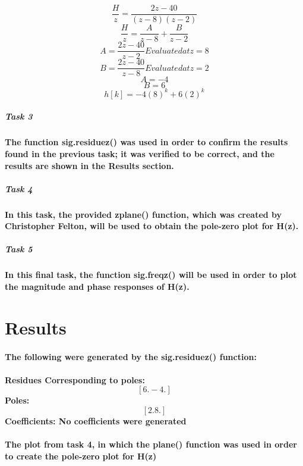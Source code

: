 \documentclass[12pt,a4paper]{article}
\begin{document}
$$\frac{H}{z} = \frac{2z-40}{(z - 8)(z - 2)}$$
$$\frac{H}{z} = \frac{A}{z-8} + \frac{B}{z-2}$$
$$A = \frac{2z-40}{z-2} Evaluated at {z=8}$$
$$B = \frac{2z-40}{z-8} Evaluated at z = 2$$
$$A = -4$$
$$B = 6$$
$$h[k] = -4(8)^k+ 6(2)^k$$

\subparagraph{\large Task 3}

\paragraph{The function sig.residuez() was used in order to confirm the results found in the previous task; it was verified to be correct, and the results are shown in the \textbf{Results} section.}

\subparagraph{\large Task 4}

\paragraph{In this task, the provided zplane() function, which was created by Christopher Felton, will be used to obtain the pole-zero plot for H(z).}

\subparagraph{\large Task 5}
\paragraph{In this final task, the function sig.freqz() will be used in order to plot the magnitude and phase responses of H(z).}

\section{Results}\label{sec:res}

\paragraph{The following were generated by the sig.residuez() function:}

\paragraph{Residues Corresponding to poles:
        $$[ 6. -4.]$$
        Poles:
        $$[2. 8.]$$ 
        Coefficients: No coefficients were generated}
    

\paragraph{The plot from task 4, in which the plane() function was used in order to create the pole-zero plot for H(z)}
\end{document}
